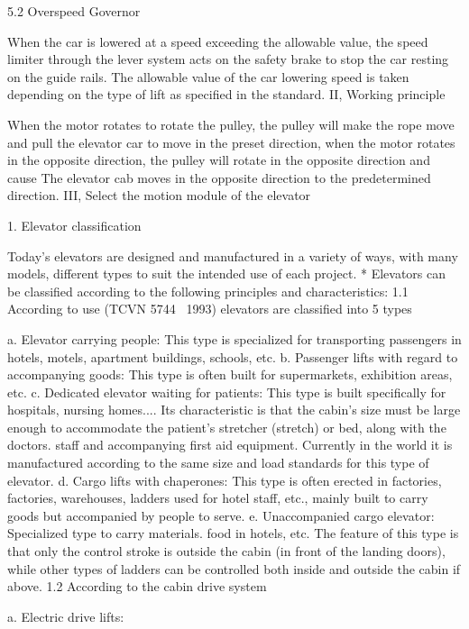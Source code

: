 5.2  Overspeed Governor

When the car is lowered at a speed exceeding the allowable value, the speed limiter through the lever system acts on the safety brake to stop the car resting on the guide rails. The allowable value of the car lowering speed is taken depending on the type of lift as specified in the standard.
II, Working principle 

When the motor rotates to rotate the pulley, the pulley will make the rope move and pull the elevator car to move in the preset direction, when the motor rotates in the opposite direction, the pulley will rotate in the opposite direction and cause The elevator cab moves in the opposite direction to the predetermined direction.
III, Select the motion module of the elevator


1. Elevator classification

Today's elevators are designed and manufactured in a variety of ways, with many models, different types to suit the intended use of each project.
* Elevators can be classified according to the following principles and characteristics:
1.1 According to use (TCVN 5744 ~1993) elevators are classified into 5 types

a.  Elevator carrying people:
This type is specialized for transporting passengers in hotels, motels, apartment buildings, schools, etc.
b.  Passenger lifts with regard to accompanying goods:
This type is often built for supermarkets, exhibition areas, etc.
c.  Dedicated elevator waiting for patients:
This type is built specifically for hospitals, nursing homes.... Its characteristic is that the cabin's size must be large enough to accommodate the patient's stretcher (stretch) or bed, along with the doctors. staff and accompanying first aid equipment. Currently in the world it is manufactured according to the same size and load standards for this type of elevator.
d.  Cargo lifts with chaperones:
This type is often erected in factories, factories, warehouses, ladders used for hotel staff, etc., mainly built to carry goods but accompanied by people to serve.
e.  Unaccompanied cargo elevator:
Specialized type to carry materials. food in hotels, etc. The feature of this type is that only the control stroke is outside the cabin (in front of the landing doors), while other types of ladders can be controlled both inside and outside the cabin if above.
1.2 According to the cabin drive system

a.	Electric drive lifts:

